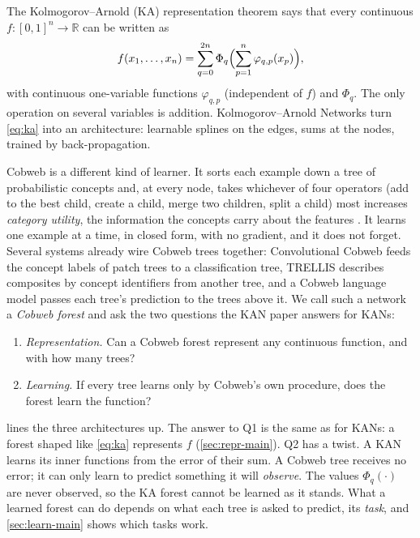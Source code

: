 \documentclass[11pt]{article}
\theoremstyle{definition}
\theoremstyle{remark}
\newcommand{\R}{\mathbb{R}}
\begin{document}
The Kolmogorov--Arnold (KA) representation theorem
\citep{kolmogorov1957,arnold1957,lorentz1966,sprecher1965} says that every continuous
$f:[0,1]^n\to\R$ can be written as
\begin{equation}\label{eq:ka}
  f(x_1,\dots,x_n)=\sum_{q=0}^{2n}\Phi_q\Bigl(\sum_{p=1}^{n}\varphi_{q,p}(x_p)\Bigr),
\end{equation}
with continuous one-variable functions $\varphi_{q,p}$ (independent of $f$) and $\Phi_q$.
The only operation on several variables is addition.  Kolmogorov--Arnold Networks
\citep{liu2024kan} turn \eqref{eq:ka} into an architecture: learnable splines on the
edges, sums at the nodes, trained by back-propagation.

Cobweb \citep{fisher1987} is a different kind of learner.  It sorts each example down a
tree of probabilistic concepts and, at every node, takes whichever of four operators
(add to the best child, create a child, merge two children, split a child) most
increases \emph{category utility}, the information the concepts carry about the features
\citep{corter1992,maclellan2026rational}.  It learns one example at a time, in closed
form, with no gradient, and it does not forget.  Several systems already wire Cobweb
trees together: Convolutional Cobweb \citep{maclellan2021conv} feeds the concept labels
of patch trees to a classification tree, TRELLIS \citep{singaravadivelan2026trellis}
describes composites by concept identifiers from another tree, and a Cobweb language
model passes each tree's prediction to the trees above it.  We call such a network a
\emph{Cobweb forest} and ask the two questions the KAN paper answers for KANs:
\begin{enumerate}[label=\textbf{Q\arabic*.},leftmargin=*,noitemsep]
\item \emph{Representation.} Can a Cobweb forest represent any continuous function, and
  with how many trees?
\item \emph{Learning.} If every tree learns only by Cobweb's own procedure, does the
  forest learn the function?
\end{enumerate}

 lines the three architectures up.  The answer to Q1 is the same as
for KANs: a forest shaped like \eqref{eq:ka} represents $f$ (\cref{sec:repr-main}).  Q2 has a
twist.  A KAN learns its inner functions from the error of their sum.  A Cobweb tree
receives no error; it can only learn to predict something it will \emph{observe}.  The
values $\Phi_q(\cdot)$ are never observed, so the KA forest cannot be learned as it
stands.  What a learned forest can do depends on what each tree is asked to predict, its
\emph{task}, and \cref{sec:learn-main} shows which tasks work.
\end{document}
